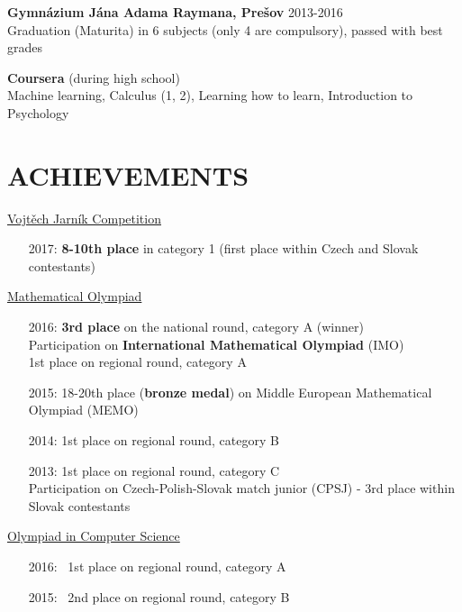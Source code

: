 \documentclass[margin, 10pt]{res} %
\begin{document}
\begin{resume}
		
		\textbf{Gymnázium Jána Adama Raymana, Prešov  
		}\hfill 2013-2016\\
		Graduation (Maturita) in 6 subjects (only 4 are compulsory), passed with best grades
		
		\textbf{Coursera} (during high school)  \\
		Machine learning, Calculus (1, 2), Learning how to learn, Introduction to Psychology
		
		\section{ACHIEVEMENTS}
		\href{http://vjimc.osu.cz/j27/j27results1.html}{Vojtěch Jarník Competition}
		\begin{itemize} \itemsep -2pt %
			\item[2017:] \textbf{8-10th place} in category 1 (first place within Czech and Slovak contestants)
		\end{itemize}
		
		\href{https://skmo.sk/poradia.php?podlink=ucastnici&uid=7082}{ Mathematical Olympiad}
		\begin{itemize} \itemsep -2pt %
			\item[2016:] 
			\textbf{3rd place} on the national round, category A (winner) \\
			Participation on \textbf{International Mathematical Olympiad} (IMO) \\
			1st place on regional round, category A
			\item[2015:]  18-20th place (\textbf{bronze medal}) on Middle European Mathematical Olympiad (MEMO)
			\item[2014:]  1st place on regional round, category B
			\item[2013:]  1st place on regional round, category C \\
			Participation on Czech-Polish-Slovak match junior (CPSJ) - 3rd place within Slovak contestants
		\end{itemize}
		\href{http://oi.sk/archive.php}{Olympiad in Computer Science}
		\begin{itemize} \itemsep -2pt %
			\item[2016:] \ 1st place on regional round, category A
			\item[2015:] \ 2nd place on regional round, category B
		\end{itemize}
		

\end{resume}
\end{document}
